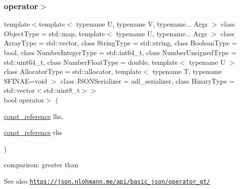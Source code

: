\subsubsection{\texorpdfstring{operator$>$}{operator>}\hspace{0.1cm}{\footnotesize\ttfamily [1/3]}}
{\footnotesize\ttfamily template$<$template$<$ typename U, typename V, typename... Args $>$ class Object\+Type = std\+::map, template$<$ typename U, typename... Args $>$ class Array\+Type = std\+::vector, class String\+Type  = std\+::string, class Boolean\+Type  = bool, class Number\+Integer\+Type  = std\+::int64\+\_\+t, class Number\+Unsigned\+Type  = std\+::uint64\+\_\+t, class Number\+Float\+Type  = double, template$<$ typename U $>$ class Allocator\+Type = std\+::allocator, template$<$ typename T, typename S\+F\+I\+N\+A\+E=void $>$ class J\+S\+O\+N\+Serializer = adl\+\_\+serializer, class Binary\+Type  = std\+::vector$<$std\+::uint8\+\_\+t$>$$>$ \\
bool operator$>$ (\begin{DoxyParamCaption}\item[{\hyperlink{classnlohmann_1_1basic__json_ab8a1c33ee7b154fc41ca2545aa9724e6}{const\+\_\+reference}}]{lhs,  }\item[{\hyperlink{classnlohmann_1_1basic__json_ab8a1c33ee7b154fc41ca2545aa9724e6}{const\+\_\+reference}}]{rhs }\end{DoxyParamCaption})\hspace{0.3cm}{\ttfamily [friend]}}



comparison\+: greater than 

\begin{DoxySeeAlso}{See also}
\href{https://json.nlohmann.me/api/basic_json/operator_gt/}{\tt https\+://json.\+nlohmann.\+me/api/basic\+\_\+json/operator\+\_\+gt/} 
\end{DoxySeeAlso}
\mbox{\label{classnlohmann_1_1basic__json_a9ea8e0e86820fcb3ab0fc937d41226e7}} 

